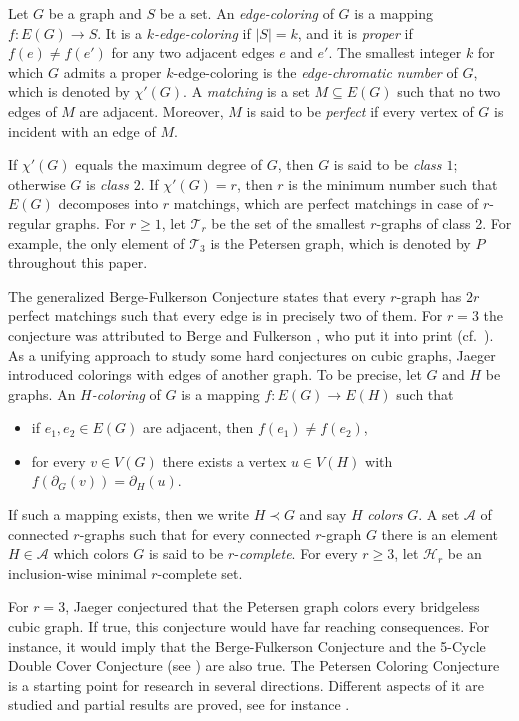 \documentclass[a4paper,11pt]{article}
\newcommand{\ca}{\mathcal}
\theoremstyle{remark}
\begin{document}
Let $G$ be a graph and $S$ be a set. An \emph{edge-coloring} of $G$ is a mapping $f\colon E(G)\to S$. It is a 
\emph{$k$-edge-coloring} if $|S|=k$, and it is \emph{proper} 
if $f(e) \not = f(e')$ for any two adjacent edges $e$ and $e'$. 
The smallest integer $k$ for which $G$ admits a proper $k$-edge-coloring 
is the \emph{edge-chromatic number} of $G$, which is denoted by $\chi'(G)$. A \emph{matching} is a set $M\subseteq E(G)$ such that no two edges of $M$ are adjacent. Moreover, $M$ is said to be \emph{perfect} if every vertex of $G$ is incident with an edge of $M$.


If $\chi'(G)$ equals the maximum degree of $G$, then $G$ is said to be \emph{class $1$}; otherwise $G$ is \emph{class $2$}. 
If $\chi'(G)=r$, then $r$ is
the minimum number such that $E(G)$ decomposes into $r$ matchings,
which are perfect matchings in case of $r$-regular graphs. For $r \geq 1$,
let $\ca T_r$ be the set of the smallest $r$-graphs of class 2. 
For example, the only element of $\ca T_3$ is the Petersen graph, which is
denoted by $P$ throughout this paper. 

The generalized Berge-Fulkerson Conjecture \cite{seymour1979multi} states that every $r$-graph
has $2r$ perfect matchings such that every edge is in precisely two of them. For $r=3$ the conjecture  was attributed to Berge and Fulkerson \cite{fulkerson1971blocking},
who put it into print (cf.~\cite{seymour1979multi}).
As a unifying approach to study some hard conjectures 
on cubic graphs, Jaeger \cite{jaeger1988nowhere} introduced colorings with
edges of another graph. To be precise, let $G$ and $H$ be graphs. An \emph{$H$-coloring} of $G$ is a mapping $f\colon E(G) \to E(H)$ such that
\begin{itemize}
	\item if $e_1,e_2 \in E(G)$ are adjacent, then $f(e_1) \neq f(e_2)$,
	\item for every $v \in V(G)$ there exists a vertex $u \in V(H)$ with $f(\partial_G(v))=\partial_H(u)$.
\end{itemize}

If such a mapping exists, then we write $H \prec G$ and say $H$ \emph{colors} $G$.
A set $\ca A$ of connected $r$-graphs such that for every connected $r$-graph $G$ 
there is an element $H \in \ca A$ which colors $G$ is said to be $r$-\emph{complete}.
For every $r\geq 3$, let $\ca H_r$ be an inclusion-wise minimal $r$-complete set.  

For $r=3$, Jaeger \cite{jaeger1988nowhere} conjectured that the Petersen graph 
colors every bridgeless cubic graph. If true, this conjecture would have far reaching 
consequences. For instance, it would imply that the Berge-Fulkerson Conjecture
and the 5-Cycle Double Cover Conjecture (see \cite{C.-Q._Zhang_book}) are 
also true.   
The Petersen Coloring Conjecture is a starting point for research in several directions. 
Different aspects of it are studied and partial results are proved, see for instance \cite{DeVos_etal_2007, Haglund_Steffen_2014, Jaeger_5_edge_coloring, Jin_partial_2021, Giuseppe_Vahan_2020, Riste_etal_2020, Robert_2017}. 
\end{document}
